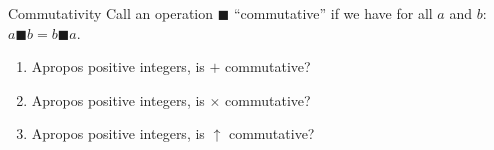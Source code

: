 \documentclass[12pt,letterpaper]{article}
\begin{document}
\begin{problem}{Commutativity}
 Call an operation $\blacksquare$ ``commutative'' if we have for all $a$ and
 $b$: $a \blacksquare b = b \blacksquare a$.

 \begin{enumerate}[\hspace{.5cm}a.]
  \item Apropos positive integers, is $+$ commutative? 
  \item Apropos positive integers, is $\times$ commutative? 
  \item Apropos positive integers, is $\uparrow$ commutative? 
 \end{enumerate}
\end{problem}
\end{document}
